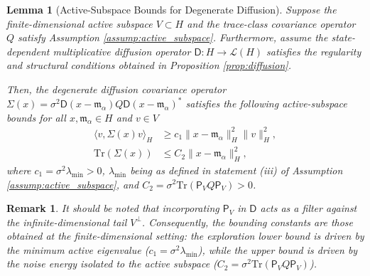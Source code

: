 \documentclass[12pt]{amsart}
\numberwithin{equation}{section}
\newtheorem{lemma}[theorem]{Lemma}
\newtheorem{remark}[theorem]{Remark}
\begin{document}
\begin{lemma}[Active-Subspace Bounds for Degenerate Diffusion] \label{lem:degenerate_covariance_bounds}
Suppose the finite-dimensional active subspace $V \subset H$ and the trace-class covariance operator $Q$ satisfy Assumption \ref{assump:active_subspace}. 
Furthermore, assume the state-dependent multiplicative diffusion operator $\mathsf{D} : H \to \mathscr{L}(H)$ satisfies the regularity and structural conditions obtained in Proposition \ref{prop:diffusion}. 

Then, the degenerate diffusion covariance operator $\Sigma(x) = \sigma^2 \mathsf{D}(x - \mathfrak{m}_{\alpha}) Q \mathsf{D}(x - \mathfrak{m}_{\alpha})^*$ satisfies the following active-subspace bounds for all $x, \mathfrak{m}_{\alpha} \in H$ and $v\in V$ 
\begin{align}
    \langle v, \Sigma(x) v \rangle_H &\geq c_1 \|x - \mathfrak{m}_{\alpha}\|_H^2 \|v\|_H^2, 
    \label{eq:sigma_lower_deg} \\
    \mathrm{Tr}(\Sigma(x)) &\leq C_2 \|x - \mathfrak{m}_{\alpha}\|_H^2, 
    \label{eq:sigma_trace_deg}
\end{align}
where $c_1 = \sigma^2 \lambda_{\min}  > 0$, $\lambda_{\min}$ being as defined in statement (iii) of Assumption \ref{assump:active_subspace}, and $C_2 =\sigma^2 \mathrm{Tr}(\mathsf{P}_V Q \mathsf{P}_V) > 0$.
\end{lemma}
\begin{remark}
    It should be noted that incorporating $\mathsf{P}_V$ in $\mathsf{D}$ acts as a filter against the infinite-dimensional tail $V^\perp$. Consequently, the bounding constants are those obtained at the finite-dimensional setting: the exploration lower bound is driven by the minimum active eigenvalue ($c_1 = \sigma^2 \lambda_{\min}$), while the  upper bound is driven by the noise energy isolated to the active subspace ($C_2 = \sigma^2 \mathrm{Tr}(\mathsf{P}_V Q \mathsf{P}_V)$).
\end{remark}
\end{document}
